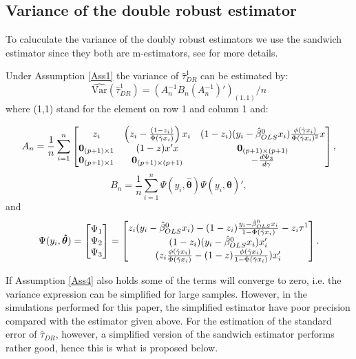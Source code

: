 \documentclass[11pt]{article}
\newcommand{\Var}{{\mbox{Var}}}
\newcommand{\bgamma}{{\bf \gamma}}
\begin{document}
\subsection*{Variance of the double robust estimator}
To caluculate the variance of the doubly robust estimators we use the sandwich estimator since they both are m-estimators, see \cite{Stefanski:2002} for more details.

Under Assumption \ref{Ass1} the variance of $\hat \tau_{DR}^1$ can be estimated by:
$$\widehat{\Var}(\hat{\tau}^1_{DR}) = (A_n^{-1} B_n (A_n^{-1})' )_{(1,1)}/ n$$
where (1,1) stand for the element on row 1 and column 1 and:


\begin{equation*}
A_n=\frac{1}{n}\sum \limits_{i =1}^n\left[
\begin{matrix}
z_i& \left(z_i - \frac{(1-z_i)}{\Phi(\hat \bgamma x_i)}\right) x_i & (1-z_i)(y_i- \hat \beta^0_{OLS}x_i) \frac{\phi(\hat \bgamma x_i)}{\Phi(\hat \bgamma x_i)^2}x \\
\boldsymbol 0_{(p+1)\times1}&(1-z)x' x &\boldsymbol 0_{(p+1)\times(p+1)}\\
\boldsymbol 0_{(p+1)\times1}&\boldsymbol 0_{(p+1)\times(p+1)}& - \frac{d \Psi_3}{d \bgamma}
\end{matrix} \right],
\end{equation*}
\begin{equation*}
B_n=\frac{1}{n}\sum \limits_{i =1}^n\Psi (y_i,  \boldsymbol{ \hat{\theta}})\Psi (y_i,  \boldsymbol{ \hat{\theta}})',
\end{equation*}
and
\begin{equation*}
\Psi (y_i,  \boldsymbol{ \hat{\theta}}) =\left[
\begin{matrix}
\Psi_1  \\
\Psi_2  \\
\Psi_3 
\end{matrix} \right]=\left[
\begin{matrix}
z_i(y_i- \hat \beta^0_{OLS}x_i) - (1-z_i)\frac{y_i- \hat \beta^0_{OLS}x_i}{1-\Phi(\hat \bgamma x_i)} - z_i \tau^1 \\
(1-z_i)(y_i- \hat \beta^0_{OLS}x_i) x_i' \\
(z_i\frac{\phi(\hat \bgamma x_i)}{\Phi(\hat \bgamma x_i)}-(1-z)\frac{\phi(\hat \bgamma x_i)}{1-\Phi(\hat \bgamma x_i)})x_i'
\end{matrix} \right].
\end{equation*}
\vspace{2mm}

\noindent If Assumption \ref{Ass4} also holds some of the terms will converge to zero, i.e. the variance expression can be simplified for large samples. However, in the simulations performed for this paper, the simplified estimator have poor precision compared with the estimator given above. For the estimation of the standard error of $\hat \tau_{DR}$, however, a simplified version of the sandwich estimator performs rather good, hence this is what is proposed below.
\end{document}
